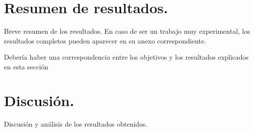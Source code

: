 
\section{Resumen de resultados.}

Breve resumen de los resultados. En caso de ser un trabajo muy experimental, los resultados completos pueden aparecer en su anexo correspondiente.

Debería haber una correspondencia entre los objetivos y los resultados explicados en esta sección

\section{Discusión.}

Discusión y análisis de los resultados obtenidos.
